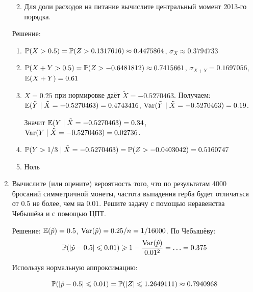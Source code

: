\documentclass[12pt, a4paper]{article}\usepackage[]{graphicx}\usepackage[]{color}
\begin{document}
\begin{enumerate}
\begin{enumerate}

						\item Для доли расходов на питание вычислите центральный момент 2013-го порядка.

					\end{enumerate}




					Решение:
					\begin{enumerate}
						\item $\P(X>0.5)=\P(Z>0.1317616)\approx 0.4475864$, $\sigma_X\approx 0.3794733$
						\item $\P(X+Y>0.5)=
						\P(Z>-0.6481812)\approx 0.7415661$,
						$\sigma_{X+Y}=0.1697056$, $\E(X+Y)=0.61$

						\item $X=0.25$ при нормировке даёт $\tilde{X}=-0.5270463$. Получаем: $\E(\tilde{Y}\mid \tilde{X}=-0.5270463)=0.4743416$,  $\Var(\tilde{Y}\mid \tilde{X}=-0.5270463)=0.19$.

						Значит $\E(Y \mid \tilde{X}=-0.5270463)=0.34$,  $\Var(Y\mid \tilde{X}=-0.5270463)=0.02736$.

						\item $\P(Y>1/3\mid \tilde{X}=-0.5270463)=\P(Z>-0.0403042)=0.5160747$
						\item Ноль
					\end{enumerate}



					\item Вычислите (или оцените) вероятность того, что по результатам 4000 бросаний симметричной монеты,  частота выпадения герба будет отличаться от 0.5 не более, чем на $0.01$. Решите задачу с помощью неравенства Чебышёва и с помощью ЦПТ.



					Решение: $\E(\hat{p})=0.5$, $\Var(\hat{p})=0.25/n=1/16000$. По Чебышёву:
					\[
					\P(|\hat{p}-0.5|\leq 0.01)\geq 1-\frac{\Var(\hat{p})}{0.01^2}=\ldots=0.375
					\]

					Используя нормальную аппроксимацию:

					\[
					\P(|\hat{p}-0.5|\leq 0.01)=\P(|Z|\leq 1.2649111)\approx 0.7940968
					\]



\end{enumerate}
\end{document}
